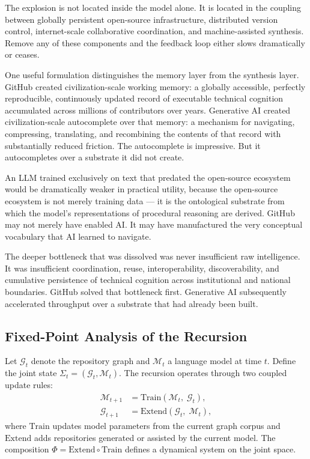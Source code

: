 \documentclass[11pt]{article}
\begin{document}
The explosion is not located inside the model alone. It is located in the
coupling between globally persistent open-source infrastructure, distributed
version control, internet-scale collaborative coordination, and machine-assisted
synthesis. Remove any of these components and the feedback loop either slows
dramatically or ceases.

One useful formulation distinguishes the memory layer from the synthesis layer.
GitHub created civilization-scale working memory: a globally accessible,
perfectly reproducible, continuously updated record of executable technical
cognition accumulated across millions of contributors over years. Generative AI
created civilization-scale autocomplete over that memory: a mechanism for
navigating, compressing, translating, and recombining the contents of that record
with substantially reduced friction. The autocomplete is impressive. But it
autocompletes over a substrate it did not create.

An LLM trained exclusively on text that predated the open-source ecosystem would
be dramatically weaker in practical utility, because the open-source ecosystem is
not merely training data --- it is the ontological substrate from which the
model's representations of procedural reasoning are derived. GitHub may not
merely have enabled AI. It may have manufactured the very conceptual vocabulary
that AI learned to navigate.

The deeper bottleneck that was dissolved was never insufficient raw intelligence.
It was insufficient coordination, reuse, interoperability, discoverability, and
cumulative persistence of technical cognition across institutional and national
boundaries. GitHub solved that bottleneck first. Generative AI subsequently
accelerated throughput over a substrate that had already been built.

\subsection*{Fixed-Point Analysis of the Recursion}

Let $\mathcal{G}_t$ denote the repository graph and $\mathcal{M}_t$ a language
model at time $t$. Define the joint state $\Sigma_t = (\mathcal{G}_t,
\mathcal{M}_t)$. The recursion operates through two coupled update rules:
\begin{align}
\mathcal{M}_{t+1} &= \mathrm{Train}(\mathcal{M}_t,\; \mathcal{G}_t), \label{eq:model-update}\\
\mathcal{G}_{t+1} &= \mathrm{Extend}(\mathcal{G}_t,\; \mathcal{M}_t), \label{eq:graph-update}
\end{align}
where $\mathrm{Train}$ updates model parameters from the current graph corpus
and $\mathrm{Extend}$ adds repositories generated or assisted by the current
model. The composition $\Phi = \mathrm{Extend} \circ \mathrm{Train}$ defines a
dynamical system on the joint space.
\end{document}
